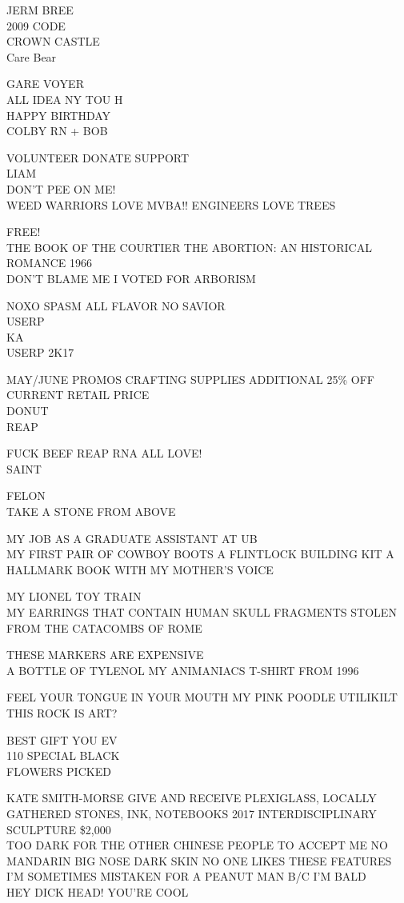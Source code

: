 \documentclass[10pt,letterpaper]{article}
\begin{document}
JERM BREE\\
2009 CODE\\
CROWN CASTLE\\
Care Bear

GARE VOYER\\
ALL IDEA NY TOU H\\
HAPPY BIRTHDAY\\
COLBY RN + BOB

VOLUNTEER DONATE SUPPORT\\
LIAM\\
DON'T PEE ON ME!\\
WEED WARRIORS LOVE MVBA!!  ENGINEERS LOVE TREES

FREE!\\
THE BOOK OF THE COURTIER THE ABORTION: AN HISTORICAL ROMANCE 1966\\
DON'T BLAME ME I VOTED FOR ARBORISM

NOXO SPASM ALL FLAVOR NO SAVIOR\\
USERP\\
KA\\
USERP 2K17

MAY/JUNE PROMOS CRAFTING SUPPLIES ADDITIONAL 25\% OFF CURRENT RETAIL PRICE\\
DONUT\\
REAP

FUCK BEEF REAP RNA ALL LOVE!\\
SAINT

FELON\\
TAKE A STONE FROM ABOVE

MY JOB AS A GRADUATE ASSISTANT AT UB\\
MY FIRST PAIR OF COWBOY BOOTS A FLINTLOCK BUILDING KIT A HALLMARK BOOK WITH MY MOTHER'S VOICE

MY LIONEL TOY TRAIN\\
MY EARRINGS THAT CONTAIN HUMAN SKULL FRAGMENTS STOLEN FROM THE CATACOMBS OF ROME

THESE MARKERS ARE EXPENSIVE\\
A BOTTLE OF TYLENOL MY ANIMANIACS T{-}SHIRT FROM 1996

FEEL YOUR TONGUE IN YOUR MOUTH MY PINK POODLE UTILIKILT\\
THIS ROCK IS ART?

BEST GIFT YOU EV\\
110 SPECIAL BLACK\\
FLOWERS PICKED

KATE SMITH{-}MORSE GIVE AND RECEIVE PLEXIGLASS, LOCALLY GATHERED STONES, INK, NOTEBOOKS 2017 INTERDISCIPLINARY SCULPTURE \$2,000\\
TOO DARK FOR THE OTHER CHINESE PEOPLE TO ACCEPT ME NO MANDARIN BIG NOSE DARK SKIN NO ONE LIKES THESE FEATURES\\
I'M SOMETIMES MISTAKEN FOR A PEANUT MAN B/C I'M BALD\\
HEY DICK HEAD!  YOU'RE COOL
\end{document}
